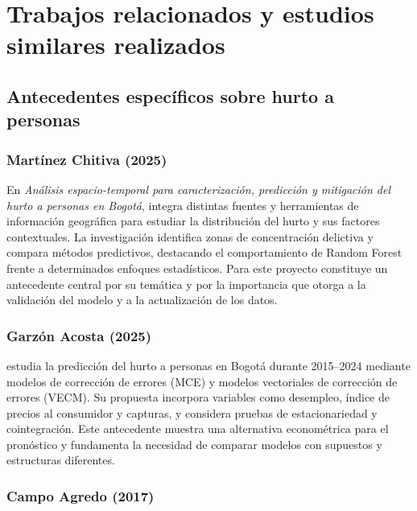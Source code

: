 
\section{Trabajos relacionados y estudios similares realizados}

\subsection{Antecedentes específicos sobre hurto a personas}

\subsubsection{Martínez Chitiva (2025)}

En \emph{Análisis espacio-temporal para caracterización, predicción y mitigación del hurto a personas en Bogotá}, \citet{martinez2025} integra distintas fuentes y herramientas de información geográfica para estudiar la distribución del hurto y sus factores contextuales. La investigación identifica zonas de concentración delictiva y compara métodos predictivos, destacando el comportamiento de Random Forest frente a determinados enfoques estadísticos. Para este proyecto constituye un antecedente central por su temática y por la importancia que otorga a la validación del modelo y a la actualización de los datos.

\subsubsection{Garzón Acosta (2025)}

\citet{garzon2025} estudia la predicción del hurto a personas en Bogotá durante 2015--2024 mediante modelos de corrección de errores (MCE) y modelos vectoriales de corrección de errores (VECM). Su propuesta incorpora variables como desempleo, índice de precios al consumidor y capturas, y considera pruebas de estacionariedad y cointegración. Este antecedente muestra una alternativa econométrica para el pronóstico y fundamenta la necesidad de comparar modelos con supuestos y estructuras diferentes.

\subsubsection{Campo Agredo (2017)}

